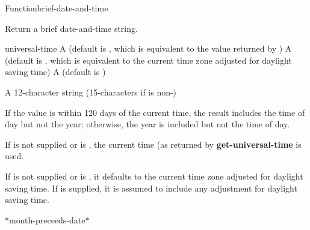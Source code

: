\documentclass[10pt,twoside,english,pdftex]{article}
\begin{document}
\begin{functiondoc}{Function}{brief-date-and-time}{
    \returns{} }
% 
% 

\fnsyntax

\fnpurpose Return a brief date-and-time string.

\fnpackage {}

\fnmodule {}

\fnargs
\begin{args}{universal-time}
 A  (default is \nil,
  which is equivalent to the value returned by
  )
 A  (default is \nil,
  which is equivalent to the current time zone adjusted for daylight
  saving time)
 A  (default is \nil)
\end{args}

\fnreturns A 12-character string (15-characters if  is non-\nil{}) 

\fndescription If the  value is within 120 days
of the current time, the result  includes the time of
day but not the year; otherwise, the year is included but not the time
of day.

\W{}
%
If  is not supplied or is \nil, the current time
(as returned by \textbf{get-universal-time} is used.  

\W{}
If  is not supplied or is \nil, it defaults to the
current time zone adjusted for daylight saving time. If
 is supplied, it is assumed to include any adjustment
for daylight saving time.

\begin{alsos}{*month-preceeds-date*}
\end{alsos}


\end{functiondoc}
\end{document}
